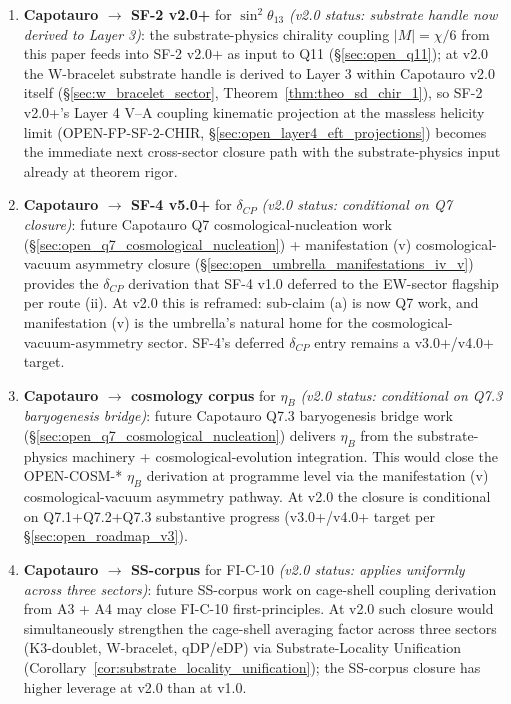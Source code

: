 \documentclass[11pt,letterpaper]{article}
\begin{document}
\begin{enumerate}\setlength\itemsep{0.2em}
    \item \textbf{Capotauro $\to$ SF-2 v2.0+} for $\sin^2\theta_{13}$ \emph{(v2.0 status: substrate handle now derived to Layer 3)}: the substrate-physics chirality coupling $|M| = \chi/6$ from this paper feeds into SF-2 v2.0+ as input to Q11 (\S\ref{sec:open_q11}); at v2.0 the W-bracelet substrate handle is derived to Layer 3 within Capotauro v2.0 itself (\S\ref{sec:w_bracelet_sector}, Theorem~\ref{thm:theo_sd_chir_1}), so SF-2 v2.0+'s Layer 4 V--A coupling kinematic projection at the massless helicity limit (OPEN-FP-SF-2-CHIR, \S\ref{sec:open_layer4_eft_projections}) becomes the immediate next cross-sector closure path with the substrate-physics input already at theorem rigor.
    \item \textbf{Capotauro $\to$ SF-4 v5.0+} for $\delta_{CP}$ \emph{(v2.0 status: conditional on Q7 closure)}: future Capotauro Q7 cosmological-nucleation work (\S\ref{sec:open_q7_cosmological_nucleation}) + manifestation (v) cosmological-vacuum asymmetry closure (\S\ref{sec:open_umbrella_manifestations_iv_v}) provides the $\delta_{CP}$ derivation that SF-4 v1.0 deferred to the EW-sector flagship per route (ii). At v2.0 this is reframed: sub-claim (a) is now Q7 work, and manifestation (v) is the umbrella's natural home for the cosmological-vacuum-asymmetry sector. SF-4's deferred $\delta_{CP}$ entry remains a v3.0+/v4.0+ target.
    \item \textbf{Capotauro $\to$ cosmology corpus} for $\eta_B$ \emph{(v2.0 status: conditional on Q7.3 baryogenesis bridge)}: future Capotauro Q7.3 baryogenesis bridge work (\S\ref{sec:open_q7_cosmological_nucleation}) delivers $\eta_B$ from the substrate-physics machinery + cosmological-evolution integration. This would close the OPEN-COSM-* $\eta_B$ derivation at programme level via the manifestation (v) cosmological-vacuum asymmetry pathway. At v2.0 the closure is conditional on Q7.1+Q7.2+Q7.3 substantive progress (v3.0+/v4.0+ target per \S\ref{sec:open_roadmap_v3}).
    \item \textbf{Capotauro $\to$ SS-corpus} for FI-C-10 \emph{(v2.0 status: applies uniformly across three sectors)}: future SS-corpus work on cage-shell coupling derivation from A3 + A4 may close FI-C-10 first-principles. At v2.0 such closure would simultaneously strengthen the cage-shell averaging factor across three sectors (K3-doublet, W-bracelet, qDP/eDP) via Substrate-Locality Unification (Corollary~\ref{cor:substrate_locality_unification}); the SS-corpus closure has higher leverage at v2.0 than at v1.0.

\end{enumerate}
\end{document}
